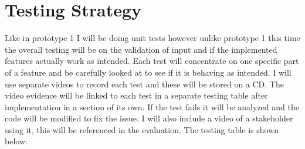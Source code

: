 \documentclass[../../../../main.tex]{subfiles}
\begin{document}
\section{Testing Strategy}
Like in prototype 1 I will be doing unit tests however unlike prototype 1 this time the overall testing will be on the validation of input and if the implemented features actually work as intended. Each test will concentrate on one specific part of a feature and be carefully looked at to see if it is behaving as intended. I will use separate videos to record each test and these will be stored on a CD. The video evidence will be linked to each test in a separate testing table after implementation in a section of its own. If the test fails it will be analyzed and the code will be modified to fix the issue. I will also include a video of a stakeholder using it, this will be referenced in the evaluation. The testing table is shown below:
\end{document}
